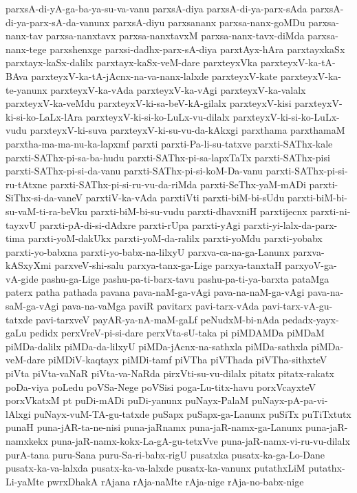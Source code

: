 {parxsA-di-yA-ga-ba-ya-su-va-vanu
parxsA-diya
parxsA-di-ya-parx-sAda
parxsA-di-ya-parx-sA-da-vanunx
parxsA-diyu
parxsananx
parxsa-nanx-goMDu
parxsa-nanx-tav
parxsa-nanxtavx
parxsa-nanxtavxM
parxsa-nanx-tavx-diMda
parxsa-nanx-tege
parxshenxge
parxsi-dadhx-parx-sA-diya
parxtAyx-hAra
parxtayxkaSx
parxtayx-kaSx-dalilx
parxtayx-kaSx-veM-dare
parxteyxVka
parxteyxV-ka-tA-BAva
parxteyxV-ka-tA-jAcnx-na-va-nanx-lalxde
parxteyxV-kate
parxteyxV-ka-te-yanunx
parxteyxV-ka-vAda
parxteyxV-ka-vAgi
parxteyxV-ka-valalx
parxteyxV-ka-veMdu
parxteyxV-ki-sa-beV-kA-gilalx
parxteyxV-kisi
parxteyxV-ki-si-ko-LaLx-lAra
parxteyxV-ki-si-ko-LuLx-vu-dilalx
parxteyxV-ki-si-ko-LuLx-vudu
parxteyxV-ki-suva
parxteyxV-ki-su-vu-da-kAkxgi
parxthama
parxthamaM
parxtha-ma-ma-nu-ka-lapxmf
parxti
parxti-Pa-li-su-tatxve
parxti-SAThx-kale
parxti-SAThx-pi-sa-ba-hudu
parxti-SAThx-pi-sa-lapxTaTx
parxti-SAThx-pisi
parxti-SAThx-pi-si-da-vanu
parxti-SAThx-pi-si-koM-Da-vanu
parxti-SAThx-pi-si-ru-tAtxne
parxti-SAThx-pi-si-ru-vu-da-riMda
parxti-SeThx-yaM-mADi
parxti-SiThx-si-da-vaneV
parxtiV-ka-vAda
parxtiVti
parxti-biM-bi-sUdu
parxti-biM-bi-su-vaM-ti-ra-beVku
parxti-biM-bi-su-vudu
parxti-dhavxniH
parxtijecnx
parxti-ni-tayxvU
parxti-pA-di-si-dAdxre
parxti-rUpa
parxti-yAgi
parxti-yi-lalx-da-parx-tima
parxti-yoM-dakUkx
parxti-yoM-da-ralilx
parxti-yoMdu
parxti-yobabx
parxti-yo-babxna
parxti-yo-babx-na-lilxyU
parxva-ca-na-ga-Lanunx
parxva-kASxyXmi
parxveV-shi-salu
parxya-tanx-ga-Lige
parxya-tanxtaH
parxyoV-ga-vA-gide
pashu-ga-Lige
pashu-pa-ti-barx-tavu
pashu-pa-ti-ya-barxta
pataMga
paterx
patha
pathada
pavana
pava-naM-ga-vAgi
pava-na-naM-ga-vAgi
pava-na-saM-ga-vAgi
pava-na-vaMga
paviR
pavitarx
pavi-tarx-vAda
pavi-tarx-vA-gu-tatxde
pavi-tarxveV
payAR-ya-nA-maM-gaLf
peNudxM-bi-nAda
pedadx-yayx-gaLu
pedidx
perxVreV-pi-si-dare
perxVta-sU-taka
pi
piMDAMDa
piMDaM
piMDa-dalilx
piMDa-da-lilxyU
piMDa-jAcnx-na-sathxla
piMDa-sathxla
piMDa-veM-dare
piMDiV-kaqtayx
piMDi-tamf
piVTha
piVThada
piVTha-sithxteV
piVta
piVta-vaNaR
piVta-va-NaRda
pirxVti-su-vu-dilalx
pitatx
pitatx-rakatx
poDa-viya
poLedu
poVSa-Nege
poVSisi
poga-Lu-titx-havu
porxVcayxteV
porxVkatxM
pt
puDi-mADi
puDi-yanunx
puNayx-PalaM
puNayx-pA-pa-vi-lAlxgi
puNayx-vuM-TA-gu-tatxde
puSapx
puSapx-ga-Lanunx
puSiTx
puTiTxtutx
punaH
puna-jAR-ta-ne-nisi
puna-jaRnamx
puna-jaR-namx-ga-Lanunx
puna-jaR-namxkekx
puna-jaR-namx-kokx-La-gA-gu-tetxVve
puna-jaR-namx-vi-ru-vu-dilalx
purA-tana
puru-Sana
puru-Sa-ri-babx-rigU
pusatxka
pusatx-ka-ga-Lo-Dane
pusatx-ka-va-lalxda
pusatx-ka-va-lalxde
pusatx-ka-vanunx
putathxLiM
putathx-Li-yaMte
pwrxDhakA
rAjana
rAja-naMte
rAja-nige
rAja-no-babx-nige
}
